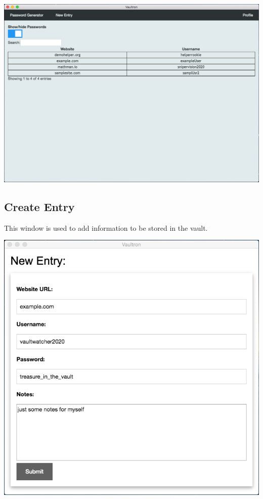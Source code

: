 \documentclass[11pt]{report}
\begin{document}
\begin{center}
\includegraphics[scale=0.40]{app-main-demo.png}
\end{center}

\subsection{Create Entry}
This window is used to add information to be stored in the vault.
\begin{center}
\includegraphics[scale=0.40]{app-newentry-demo.png}
\end{center}
\end{document}
